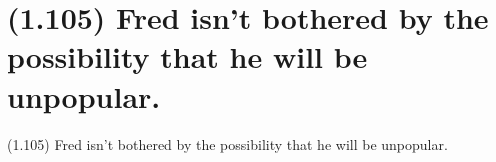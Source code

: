 \documentclass{article}
\begin{document}
\clearpage

%
%

\section*{(1.105) Fred isn't bothered by the possibility that he will be unpopular.}

\bigbreak
\begin{enumerate*}
\item[(1.105)] Fred isn't bothered by the possibility that he will be unpopular.
\end{enumerate*}
\bigbreak
\end{document}
